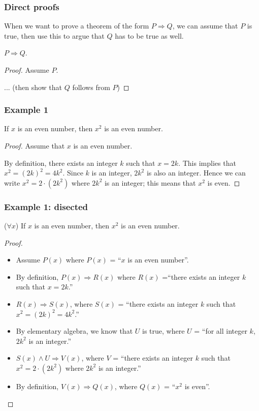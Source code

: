 \begin{frame}\frametitle{Direct proofs}
  When we want to prove a theorem of the form $P\Rightarrow Q$, we can
  assume that $P$ is true, then use this to argue that $Q$ has to be
  true as well.

  \begin{tcolorbox}[title=Direct proofs]
    \begin{theorem}
      $P\Rightarrow Q$.
    \end{theorem}
    \begin{proof}
      Assume $P$.
      
      ... (then show that $Q$ follows from $P$)
    \end{proof}
  \end{tcolorbox}
\end{frame}

\begin{frame}\frametitle{Example 1}
  \begin{theorem}
    If $x$ is an even number, then $x^2$ is an even number.
  \end{theorem} \pause
  \begin{proof}
    Assume that $x$ is an even number. \pause

    By definition, there exists an integer $k$ such that
    $x=2k$. \pause This implies that $x^2 = (2k)^2 = 4k^2$.  \pause
    Since $k$ is an integer, $2k^2$ is also an integer.  Hence we can
    write $x^2 = 2\cdot (2k^2)$ where $2k^2$ is an integer; this means
    that $x^2$ is even.
  \end{proof}
\end{frame}

\begin{frame}\frametitle{Example 1: disected}
  \begin{theorem}
    ($\forall x$) If $x$ is an even number, then $x^2$ is an even
    number.
  \end{theorem} \pause
  \begin{proof}
    {\small
      \begin{itemize}
      \item Assume $P(x)$ where $P(x)$ = ``$x$ is an even
        number''. \pause
      \item By definition, $P(x)\Rightarrow R(x)$ where $R(x)$ =``there
        exists an integer $k$ such that $x=2k$.'' \pause
      \item $R(x)\Rightarrow S(x)$, where $S(x)$ = ``there exists an
        integer $k$ such that $x^2 = (2k)^2 = 4k^2$.''  \pause
      \item By elementary algebra, we know that $U$ is true, where $U$ =
        ``for all integer $k$, $2k^2$ is an integer.''  \pause
      \item $S(x)\wedge U\Rightarrow V(x)$, where $V$ = ``there exists
        an integer $k$ such that $x^2 = 2\cdot (2k^2)$ where $2k^2$ is
        an integer.'' \pause
      \item By definition, $V(x)\Rightarrow Q(x)$, where $Q(x)$ = ``$x^2$
        is even''.
      \end{itemize}
    }
  \end{proof}
\end{frame}

